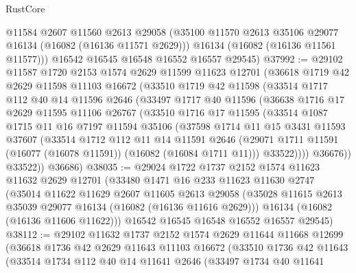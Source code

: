 \begin{lexlean}{RustCore}
\begin{coremodule}
        @11584
        @2607
        @11560
        @2613
        @29058
        (@35100 @11570 @2613 @35106 @29077 @16134 (@16082 (@16136 @11571 @2629)))
        @16134
        (@16082 (@16136 @11561 @11577)))
      @16542
      @16545
      @16548
      @16552
      @16557
      @29545)
@37992 := @29102
    @11587
    @1720
    @2153
    @1574
    @2629
    @11599
    @11623
    @12701
    (@36618
      @1719
      @42
      @2629
      @11598
      @11103
      @16672
      (@33510
        @1719
        @42
        @11598
        (@33514
          @1717
          @112
          @40
          @14
          @11596
          @2646
          (@33497
            @1717
            @40
            @11596
            (@36638
              @1716
              @17
              @2629
              @11595
              @11106
              @26767
              (@33510
                @1716
                @17
                @11595
                (@33514
                  @1087
                  @1715
                  @11
                  @16
                  @7197
                  @11594
                  @35106
                  (@37598
                    @1714
                    @11
                    @15
                    @3431
                    @11593
                    @37607
                    (@33514
                      @1712
                      @112
                      @11
                      @14
                      @11591
                      @2646
                      (@29071 @1711 @11591 (@16077 (@16078 @11591)) (@16082 (@16084 @1711 @11)))
                      @33522))))
              @36676))
          @33522))
      @36686)
@38035 := @29024
    @1722
    @1737
    @2152
    @1574
    @11623
    @11632
    @2629
    @12701
    (@33480
      @1471
      @16
      @233
      @11623
      @11630
      @2747
      (@35014
        @11622
        @11629
        @2607
        @11605
        @2613
        @29058
        (@35028 @11615 @2613 @35039 @29077 @16134 (@16082 (@16136 @11616 @2629)))
        @16134
        (@16082 (@16136 @11606 @11622)))
      @16542
      @16545
      @16548
      @16552
      @16557
      @29545)
@38112 := @29102
    @11632
    @1737
    @2152
    @1574
    @2629
    @11644
    @11668
    @12699
    (@36618
      @1736
      @42
      @2629
      @11643
      @11103
      @16672
      (@33510
        @1736
        @42
        @11643
        (@33514
          @1734
          @112
          @40
          @14
          @11641
          @2646
          (@33497
            @1734
            @40
            @11641

\end{coremodule}
\end{lexlean}
